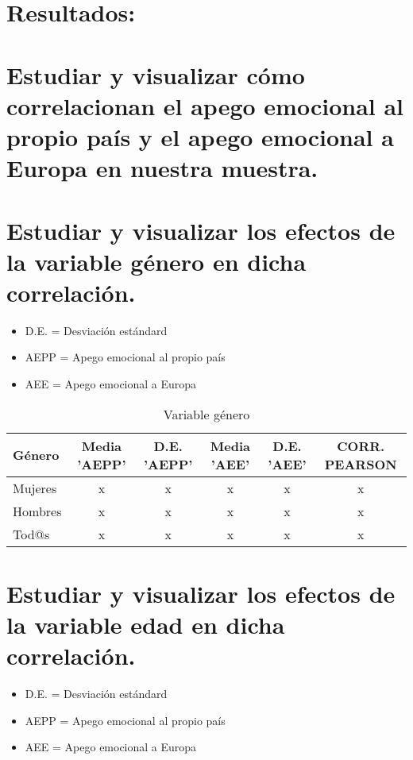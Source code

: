 \documentclass{article}
\begin{document}
\section*{Resultados:}

\section{Estudiar y visualizar cómo correlacionan el apego emocional al propio país y el apego emocional a Europa en nuestra muestra.}

\section{Estudiar y visualizar los efectos de la variable género en dicha correlación.}
 \begin{itemize}
 \item D.E. = Desviación estándard
 \item AEPP = Apego emocional al propio país
 \item AEE = Apego emocional a Europa
 \end{itemize}
 
 \begin{table}[h!]
 \caption{Variable género}
 \begin{tabular}{l | c c c c c}
 \hline
 \bf{Género} & \bf{Media 'AEPP'} & \bf{D.E. 'AEPP'} & \bf{Media 'AEE'} & \bf{D.E. 'AEE'} & \bf{CORR. PEARSON} \\
 \hline
 Mujeres & x & x & x & x & x \\
 Hombres & x & x & x & x & x \\
 Tod@s & x & x & x & x & x \\
 \hline
 \end{tabular}
 \end{table}

\section{Estudiar y visualizar los efectos de la variable edad en dicha correlación.}
 \begin{itemize}
 \item D.E. = Desviación estándard
 \item AEPP = Apego emocional al propio país
 \item AEE = Apego emocional a Europa
 \end{itemize}
 
\end{document}
